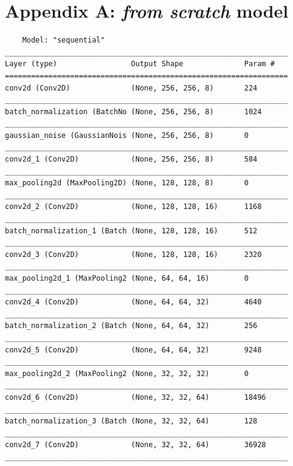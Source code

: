 \documentclass[10.5pt,a4paper,twocolumn]{article}
\begin{document}
\section{Appendix A: \textit{from scratch} model}
\begin{verbatim}
    Model: "sequential"
_________________________________________________________________
Layer (type)                 Output Shape              Param #   
=================================================================
conv2d (Conv2D)              (None, 256, 256, 8)       224       
_________________________________________________________________
batch_normalization (BatchNo (None, 256, 256, 8)       1024      
_________________________________________________________________
gaussian_noise (GaussianNois (None, 256, 256, 8)       0         
_________________________________________________________________
conv2d_1 (Conv2D)            (None, 256, 256, 8)       584       
_________________________________________________________________
max_pooling2d (MaxPooling2D) (None, 128, 128, 8)       0         
_________________________________________________________________
conv2d_2 (Conv2D)            (None, 128, 128, 16)      1168      
_________________________________________________________________
batch_normalization_1 (Batch (None, 128, 128, 16)      512       
_________________________________________________________________
conv2d_3 (Conv2D)            (None, 128, 128, 16)      2320      
_________________________________________________________________
max_pooling2d_1 (MaxPooling2 (None, 64, 64, 16)        0         
_________________________________________________________________
conv2d_4 (Conv2D)            (None, 64, 64, 32)        4640      
_________________________________________________________________
batch_normalization_2 (Batch (None, 64, 64, 32)        256       
_________________________________________________________________
conv2d_5 (Conv2D)            (None, 64, 64, 32)        9248      
_________________________________________________________________
max_pooling2d_2 (MaxPooling2 (None, 32, 32, 32)        0         
_________________________________________________________________
conv2d_6 (Conv2D)            (None, 32, 32, 64)        18496     
_________________________________________________________________
batch_normalization_3 (Batch (None, 32, 32, 64)        128       
_________________________________________________________________
conv2d_7 (Conv2D)            (None, 32, 32, 64)        36928     
_________________________________________________________________

\end{verbatim}
\end{document}
